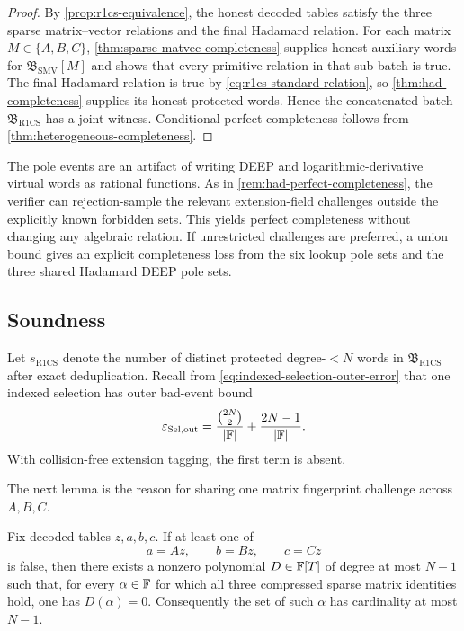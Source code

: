 \begin{proof}
By \cref{prop:r1cs-equivalence}, the honest decoded tables satisfy the three sparse matrix--vector relations and the final Hadamard relation.  For each matrix $M\in\{A,B,C\}$, \cref{thm:sparse-matvec-completeness} supplies honest auxiliary words for $\mathfrak B_{\mathrm{SMV}}[M]$ and shows that every primitive relation in that sub-batch is true.  The final Hadamard relation is true by \eqref{eq:r1cs-standard-relation}, so \cref{thm:had-completeness} supplies its honest protected words.  Hence the concatenated batch $\mathfrak B_{\mathrm{R1CS}}$ has a joint witness.  Conditional perfect completeness follows from \cref{thm:heterogeneous-completeness}.
\end{proof}

\begin{remark}
\label{rem:r1cs-perfect-completeness}
The pole events are an artifact of writing DEEP and logarithmic-derivative virtual words as rational functions.  As in \cref{rem:had-perfect-completeness}, the verifier can rejection-sample the relevant extension-field challenges outside the explicitly known forbidden sets.  This yields perfect completeness without changing any algebraic relation.  If unrestricted challenges are preferred, a union bound gives an explicit completeness loss from the six lookup pole sets and the three shared Hadamard DEEP pole sets.
\end{remark}

\subsection{Soundness}
\label{sec:r1cs-soundness}

Let $s_{\mathrm{R1CS}}$ denote the number of distinct protected degree-$<N$ words in $\mathfrak B_{\mathrm{R1CS}}$ after exact deduplication.  Recall from \eqref{eq:indexed-selection-outer-error} that one indexed selection has outer bad-event bound
\begin{equation}
  \varepsilon_{\mathrm{Sel,out}}
  =\frac{\binom{2N}{2}}{|\mathbb{F}|}
   +\frac{2N-1}{|\mathbb{F}|}.
  \label{eq:r1cs-selection-outer-error}
\end{equation}
With collision-free extension tagging, the first term is absent.

The next lemma is the reason for sharing one matrix fingerprint challenge across $A,B,C$.

\begin{lemma}
\label{lem:r1cs-shared-alpha}
Fix decoded tables $z,a,b,c$.  If at least one of
\begin{equation}
  a=Az,
  \qquad
  b=Bz,
  \qquad
  c=Cz
  \label{eq:r1cs-three-matvec-equations}
\end{equation}
is false, then there exists a nonzero polynomial $D\in\mathbb{F}[T]$ of degree at most $N-1$ such that, for every $\alpha\in\mathbb{F}$ for which all three compressed sparse matrix identities hold, one has $D(\alpha)=0$.  Consequently the set of such $\alpha$ has cardinality at most $N-1$.
\end{lemma}

